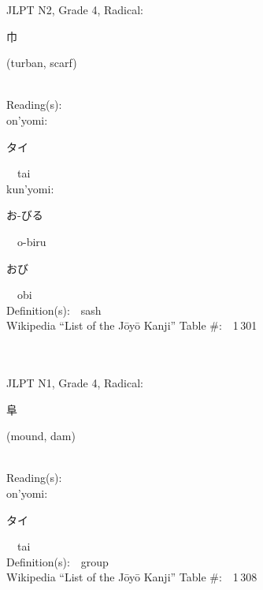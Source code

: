 \begin{multicols}{2}
{JLPT N2, Grade 4, Radical:\ \ {\begin{CJK}{UTF8}{min} 巾 \end{CJK}} (turban, scarf) } \\
Reading(s):\ \ \\
{\hspace*{1em}}on'yomi:\ \ \\
{\hspace*{2em}}{\begin{CJK}{UTF8}{min} タイ \end{CJK}}\ \ tai\ \ \\
{\hspace*{1em}}kun'yomi:\ \ \\
{\hspace*{2em}}{\begin{CJK}{UTF8}{min} お-びる \end{CJK}}\ \ o-biru\ \ \\
{\hspace*{2em}}{\begin{CJK}{UTF8}{min} おび \end{CJK}}\ \ obi\ \ \\
Definition(s):\ \ sash \\
Wikipedia ``List of the J\=oy\=o Kanji'' Table \#:\ \ 1\,301 \\
\ \ \\
{\fontsize{34pt}{40pt}  }\ \ \\  %
{JLPT N1, Grade 4, Radical:\ \ {\begin{CJK}{UTF8}{min} 阜 \end{CJK}} (mound, dam) } \\
Reading(s):\ \ \\
{\hspace*{1em}}on'yomi:\ \ \\
{\hspace*{2em}}{\begin{CJK}{UTF8}{min} タイ \end{CJK}}\ \ tai\ \ \\
Definition(s):\ \ group \\
Wikipedia ``List of the J\=oy\=o Kanji'' Table \#:\ \ 1\,308 \\
\ \ \\
{\fontsize{34pt}{40pt}  }\ \ \\  %

\end{multicols}

